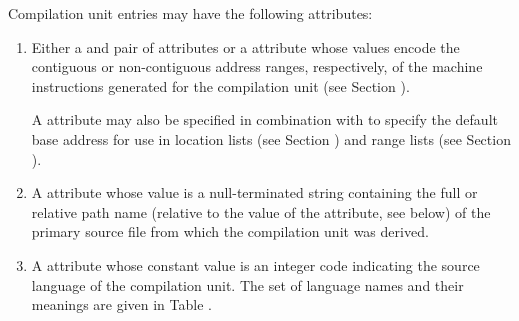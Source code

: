 Compilation unit entries may have the following 
attributes:
\begin{enumerate}[1. ]
\item Either a \DWATlowpc{} and 
\DWAThighpc{} pair of
attributes 
or 
a 
\DWATranges{} attribute
whose values encode 
the contiguous or 
non-contiguous address ranges, respectively,
of the machine instructions generated for the compilation
unit (see Section ).
  
A \DWATlowpc{} attribute 
may also be specified in combination 
with 
\DWATranges{} to specify the
default base address for use in 
location lists (see Section
) and range lists 
(see Section ).

\item \hypertarget{chap:DWATnamepathnameofcompilationsource}{}
A \DWATnameDEFN{} attribute 
whose value is a null-terminated string 
containing the full or relative path name 
(relative to the value of the \DWATcompdir{} attribute, 
see below) of the primary
source file from which the compilation unit was derived.

\item \hypertarget{chap:DWATlanguageprogramminglanguage}{}
A \DWATlanguageDEFN{} attribute
whose constant value is an integer code 
indicating the source language of the compilation
unit. The set of language names and their meanings are given
in Table .


\end{enumerate}
